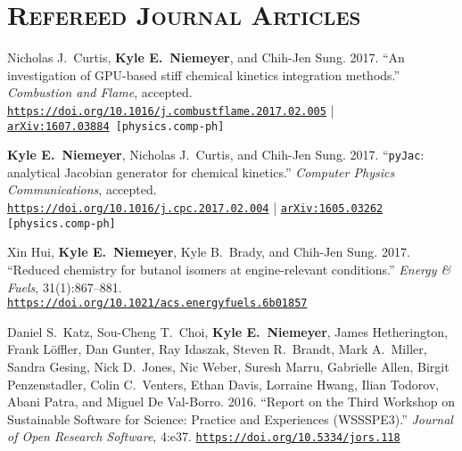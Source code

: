 \documentclass[margin,line,11pt]{res}
\makeatletter
\newlength{\bibhang}
\newlength{\bibsep}
 {\@listi \global\bibsep\itemsep \global\advance\bibsep by\parsep}
\newenvironment{bibenum*}
  {\renewcommand\labelenumi{\theenumi.}%
   \etaremune[
     topsep=0pt,
     itemsep=\bibsep,
     parsep=0pt,partopsep=0pt,
     itemindent=-\bibhang,
     leftmargin={\bibhang+\widthof{[999]}}]}
  {\endetaremune}
\newcommand*{\doi}[1]{\href{https://doi.org/#1}{\nolinkurl{https://doi.org/#1}}}
\makeatother
\begin{document}
\begin{resume}
\begin{bibenum*}

\end{bibenum*}

\section{\textsc{Refereed Journal Articles}}

\begin{bibenum*}

\item Nicholas J.~Curtis, \textbf{Kyle E.~Niemeyer}, and Chih-Jen Sung.
2017.
``An investigation of GPU-based stiff chemical kinetics integration methods.''
\textit{Combustion and Flame}, accepted.
\doi{10.1016/j.combustflame.2017.02.005} | \\
{\tt \href{http://arxiv.org/abs/1607.03884}{arXiv:1607.03884} [physics.comp-ph]}

\item \textbf{Kyle E.~Niemeyer}, Nicholas J.~Curtis, and Chih-Jen Sung.
2017.
``\texttt{pyJac}: analytical Jacobian generator for chemical kinetics.''
\textit{Computer Physics Communications}, accepted. \\
\doi{10.1016/j.cpc.2017.02.004} |
{\tt \href{http://arxiv.org/abs/1605.03262}{arXiv:1605.03262} [physics.comp-ph]}

\item Xin Hui, \textbf{Kyle E.~Niemeyer}, Kyle B.~Brady, and Chih-Jen Sung.
2017.
``Reduced chemistry for butanol isomers at engine-relevant conditions.''
\textit{Energy \& Fuels}, 31(1):867--881. \\
\doi{10.1021/acs.energyfuels.6b01857}

\item Daniel S.~Katz, Sou-Cheng T.\ Choi, \textbf{Kyle E.\ Niemeyer}, James Hetherington, Frank L\"{o}ffler, Dan Gunter, Ray Idaszak, Steven R.\ Brandt, Mark A.\ Miller, Sandra Gesing, Nick D.\ Jones, Nic Weber, Suresh Marru, Gabrielle Allen, Birgit Penzenstadler, Colin C.\ Venters, Ethan Davis, Lorraine Hwang, Ilian Todorov, Abani Patra, and Miguel De Val-Borro.
2016.
``Report on the Third Workshop on Sustainable Software for Science: Practice and Experiences (WSSSPE3).''
\emph{Journal of Open Research Software}, 4:e37.
\doi{10.5334/jors.118}


\end{bibenum*}
\end{resume}
\end{document}
